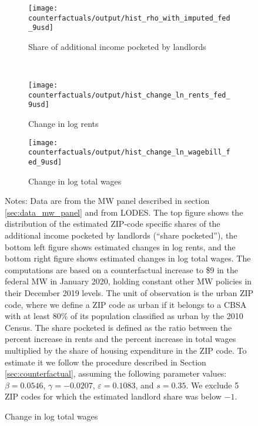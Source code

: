 \begin{figure}[h!]
    \centering
    \caption{Estimated shares pocketed by landlords under a counterfactual increase 
             in the federal minimum wage to \$9, urban ZIP codes}
    \label{fig:cf_hist_rents_wages_shares}

    \begin{subfigure}{0.65\textwidth}
        \caption*{Share of additional income pocketed by landlords}
        \texttt{[image: counterfactuals/output/hist\_rho\_with\_imputed\_fed\_9usd]}
    \end{subfigure}\\
    \begin{subfigure}{0.5\textwidth}
        \caption*{Change in log rents}
        \texttt{[image: counterfactuals/output/hist\_change\_ln\_rents\_fed\_9usd]}
    \end{subfigure}%
    \begin{subfigure}{0.5\textwidth}
        \caption*{Change in log total wages}
        \texttt{[image: counterfactuals/output/hist\_change\_ln\_wagebill\_fed\_9usd]}
    \end{subfigure}

    \begin{minipage}{.95\textwidth} \footnotesize
        \vspace{3mm}
        Notes:
        Data are from the MW panel described in section \ref{sec:data_mw_panel} 
        and from LODES.
        The top figure shows the distribution of the estimated ZIP-code specific
        shares of the additional income pocketed by landlords (``share pocketed''), 
        the bottom left figure shows estimated changes in log rents, and 
        the bottom right figure shows estimated changes in log total wages.
        The computations are based on a counterfactual increase to \$9 in the 
        federal MW in January 2020, holding constant other MW policies in their 
        December 2019 levels.
        The unit of observation is the urban ZIP code, where we define a ZIP code 
        as urban if it belongs to a CBSA with at least 80\% of its population 
        classified as urban by the 2010 Census.
        The share pocketed is defined as the ratio between the percent increase 
        in rents and the percent increase in total wages multiplied by the share 
        of housing expenditure in the ZIP code.
        To estimate it we follow the procedure described in Section 
        \ref{sec:counterfactual}, assuming the following parameter values: 
        $\beta = 0.0546$, $\gamma = -0.0207$, $\varepsilon = 0.1083$, and 
        $s = 0.35$.
        We exclude 5 ZIP codes for which the estimated landlord share was 
        below $-1$.
    \end{minipage}
\end{figure}

